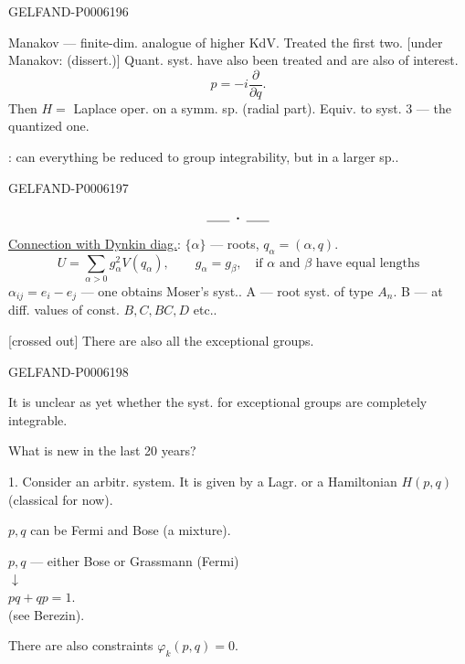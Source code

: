 \begin{GelfandAdjacentEvidence}{GELFAND-P000619}{6}


Manakov — finite-dim. analogue of higher KdV. Treated the first two.
[under Manakov: (dissert.)]
Quant. syst. have also been treated and are also of interest.
\[
p=-i\frac{\partial}{\partial q}.
\]
Then \(H=\) Laplace oper. on a symm. sp. (radial part).
Equiv. to syst. 3 — the quantized one.

: can everything be reduced to group integrability, but in a larger sp..
\end{GelfandAdjacentEvidence}
\begin{GelfandAdjacentEvidence}{GELFAND-P000619}{7}

\[\rule{1.8em}{.4pt}\;\boldsymbol{\cdot}\;\rule{1.8em}{.4pt}\]
\underline{Connection with Dynkin diag.}: \(\{\alpha\}\) — roots, \(q_\alpha=(\alpha,q)\).
\[
U=\sum_{\alpha>0}g_\alpha^2V(q_\alpha),\qquad
g_\alpha=g_\beta,\quad\text{if \(\alpha\) and \(\beta\) have equal lengths}
\]
\(\alpha_{ij}=e_i-e_j\) — one obtains Moser’s syst..
A — root syst. of type \(A_n\).
B — at diff. values of const. \(B,C,BC,D\) etc..

[crossed out] There are also all the exceptional groups.
\end{GelfandAdjacentEvidence}
\begin{GelfandAdjacentEvidence}{GELFAND-P000619}{8}

It is unclear as yet whether the syst. for exceptional groups are completely integrable.

\qquad What is new in the last 20 years?

1. Consider an arbitr. system. It is given by a Lagr. or a Hamiltonian \(H(p,q)\) (classical for now).

\(p,q\) can be Fermi and Bose (a mixture).
\begin{flushright}
\(p,q\) — either Bose or Grassmann (Fermi)\\
\(\downarrow\)\\
\(pq+qp=1\).\\
(see Berezin).
\end{flushright}

There are also constraints \(\varphi_k(p,q)=0\).
\end{GelfandAdjacentEvidence}
